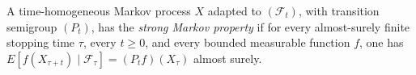 
A time-homogeneous Markov process $X$ adapted to $(\mathcal F_t)$, with transition semigroup $(P_t)$, has the \emph{strong Markov property} if for every almost-surely finite stopping time $\tau$, every $t\ge0$, and every bounded measurable function $f$, one has $E[f(X_{\tau+t})\mid\mathcal F_\tau]=(P_t f)(X_\tau)$ almost surely.
